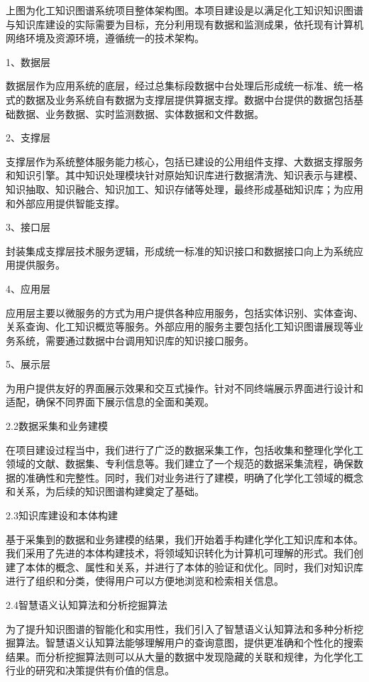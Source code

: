 上图为化工知识图谱系统项目整体架构图。本项目建设是以满足化工知识知识图谱与知识库建设的实际需要为目标，充分利用现有数据和监测成果，依托现有计算机网络环境及资源环境，遵循统一的技术架构。

1、数据层

数据层作为应用系统的底层，经过总集标段数据中台处理后形成统一标准、统一格式的数据及业务系统自有数据为支撑层提供算据支撑。数据中台提供的数据包括基础数据、业务数据、实时监测数据、实体数据和文件数据。

2、支撑层

支撑层作为系统整体服务能力核心，包括已建设的公用组件支撑、大数据支撑服务和知识引擎。其中知识处理模块针对原始知识库进行数据清洗、知识表示与建模、知识抽取、知识融合、知识加工、知识存储等处理，最终形成基础知识库；为应用和外部应用提供智能支撑。

3、接口层

封装集成支撑层技术服务逻辑，形成统一标准的知识接口和数据接口向上为系统应用提供服务。

4、应用层

应用层主要以微服务的方式为用户提供各种应用服务，包括实体识别、实体查询、关系查询、化工知识概览等服务。外部应用的服务主要包括化工知识图谱展现等业务系统，需要通过数据中台调用知识库的知识接口服务。

5、展示层

为用户提供友好的界面展示效果和交互式操作。针对不同终端展示界面进行设计和适配，确保不同界面下展示信息的全面和美观。

2.2数据采集和业务建模



在项目建设过程当中，我们进行了广泛的数据采集工作，包括收集和整理化学化工领域的文献、数据集、专利信息等。我们建立了一个规范的数据采集流程，确保数据的准确性和完整性。同时，我们对业务进行了建模，明确了化学化工领域的概念和关系，为后续的知识图谱构建奠定了基础。

2.3知识库建设和本体构建



基于采集到的数据和业务建模的结果，我们开始着手构建化学化工知识库和本体。我们采用了先进的本体构建技术，将领域知识转化为计算机可理解的形式。我们创建了本体的概念、属性和关系，并进行了本体的验证和优化。同时，我们对知识库进行了组织和分类，使得用户可以方便地浏览和检索相关信息。

2.4智慧语义认知算法和分析挖掘算法

为了提升知识图谱的智能化和实用性，我们引入了智慧语义认知算法和多种分析挖掘算法。智慧语义认知算法能够理解用户的查询意图，提供更准确和个性化的搜索结果。而分析挖掘算法则可以从大量的数据中发现隐藏的关联和规律，为化学化工行业的研究和决策提供有价值的信息。

